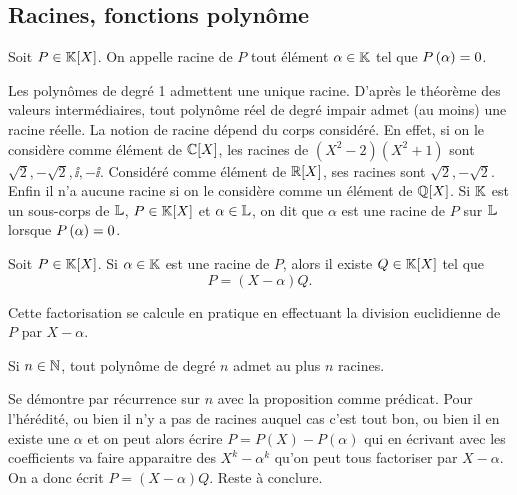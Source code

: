 \documentclass{magnolia}
\begin{document}
\subsection{Racines, fonctions polynôme}

\begin{definition}
Soit $P\in\polyK$. On appelle racine de $P$ tout élément $\alpha\in\mathbb{K}$ tel que
$P\left(\alpha\right)=0$.
\end{definition}

\begin{remarques}
\remarque Les polynômes de degré 1 admettent une unique racine.
\remarque D'après le théorème des valeurs intermédiaires, tout polynôme
  réel de degré impair admet (au moins) une racine réelle.
\remarque La notion de racine dépend du corps considéré. En effet, si on le
  considère comme élément de $\polyC$, les racines de \mbox{$(X^2-2)(X^2+1)$} sont
  $\sqrt{2},-\sqrt{2},\ii,-\ii$. Considéré comme élément de $\polyR$,
  ses racines sont $\sqrt{2},-\sqrt{2}$. Enfin il n'a aucune racine si
  on le considère comme un élément de $\polyQ$.
\remarque Si $\mathbb{K}$ est un sous-corps de $\mathbb{L}$, $P\in\polyK$
  et $\alpha\in\mathbb{L}$, on dit que $\alpha$ est une racine de $P$ sur $\mathbb{L}$
  lorsque $P\left(\alpha\right)=0$.
\end{remarques}


\begin{proposition}
Soit $P\in\polyK$. Si $\alpha\in\mathbb{K}$ est une racine de $P$, alors il existe $Q\in\polyK$ tel
que
\[P=(X-\alpha)Q.\]
\end{proposition}

\begin{remarqueUnique}
\remarque Cette factorisation se calcule en pratique en effectuant la
  division euclidienne de $P$ par $X-\alpha$.
\end{remarqueUnique}

\begin{proposition}
Si $n\in\mathbb{N}$, tout polynôme de degré $n$ admet au plus $n$ racines.
\end{proposition}

\begin{preuve}
Se démontre par récurrence sur $n$ avec la proposition comme prédicat. Pour l'hérédité, ou bien il n'y a pas de racines auquel cas c'est tout bon, ou bien il en existe une $\alpha$ et on peut alors écrire $P=P(X)-P(\alpha)$ qui en écrivant avec les coefficients va faire apparaitre des $X^k-\alpha^k$ qu'on peut tous factoriser par $X-\alpha$. On a donc écrit $P=(X-\alpha)Q$. Reste à conclure.
\end{preuve}
\end{document}
